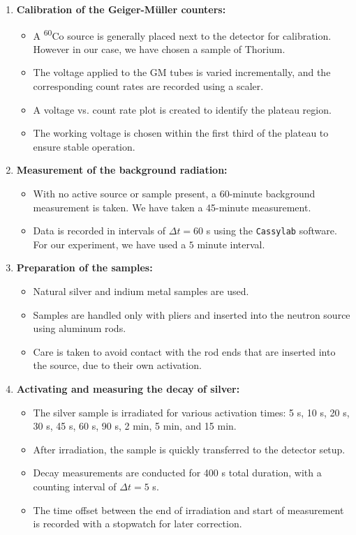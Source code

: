 \documentclass[12pt,a4paper]{article}
\begin{document}
\begin{enumerate}
  \item \textbf{Calibration of the Geiger-Müller counters:}
  \begin{itemize}
    \item A \textsuperscript{60}Co source is generally placed next to the detector for calibration. However in our case, we have chosen a sample of Thorium.
    \item The voltage applied to the GM tubes is varied incrementally, and the corresponding count rates are recorded using a scaler.
    \item A voltage vs. count rate plot is created to identify the plateau region.
    \item The working voltage is chosen within the first third of the plateau to ensure stable operation.
  \end{itemize}

  \item \textbf{Measurement of the background radiation:}
  \begin{itemize}
    \item With no active source or sample present, a 60-minute background measurement is taken. We have taken a 45-minute measurement.
    \item Data is recorded in intervals of $\Delta t = 60$ s using the \texttt{Cassylab} software. For our experiment, we have used a $5$ minute interval.
  \end{itemize}

  \item \textbf{Preparation of the samples:}
  \begin{itemize}
    \item Natural silver and indium metal samples are used.
    \item Samples are handled only with pliers and inserted into the neutron source using aluminum rods.
    \item Care is taken to avoid contact with the rod ends that are inserted into the source, due to their own activation.
  \end{itemize}

  \item \textbf{Activating and measuring the decay of silver:}
  \begin{itemize}
    \item The silver sample is irradiated for various activation times: 5 s, 10 s, 20 s, 30 s, 45 s, 60 s, 90 s, 2 min, 5 min, and 15 min.
    \item After irradiation, the sample is quickly transferred to the detector setup.
    \item Decay measurements are conducted for 400 s total duration, with a counting interval of $\Delta t = 5$ s.
    \item The time offset between the end of irradiation and start of measurement is recorded with a stopwatch for later correction.
  \end{itemize}


\end{enumerate}
\end{document}
